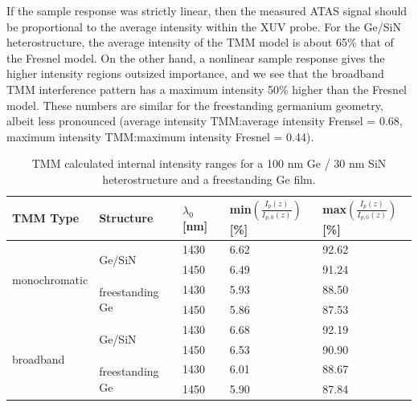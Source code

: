 If the sample response was strictly linear, then the measured ATAS signal should be proportional to the average intensity within the XUV probe. For the Ge/SiN heterostructure, the average intensity of the TMM model is about 65\% that of the Fresnel model. On the other hand, a nonlinear sample response gives the higher intensity regions outsized importance, and we see that the broadband TMM interference pattern has a maximum intensity 50\% higher than the Fresnel model. These numbers are similar for the freestanding germanium geometry, albeit less pronounced (average intensity TMM:average intensity Frensel = 0.68, maximum intensity TMM:maximum intensity Fresnel = 0.44).

\begin{table}[]
	\centering
	\begin{tabular}{l|l|l|l|l}
		\textbf{TMM Type} &
		\textbf{Structure} &
		\textbf{$\lambda_0$ {[}nm{]}} &
		\textbf{min$\left(\frac{I_p(z)}{I_{p,0}(z)}\right)$ {[}\%{]}} &
		\textbf{max$\left(\frac{I_p(z)}{I_{p,0}(z)}\right)$ {[}\%{]}} \\ \hline
		\multirow{4}{*}{monochromatic} & \multirow{2}{*}{Ge/SiN}          & 1430 & 6.62 & 92.62 \\
		&                                  & 1450 & 6.49 & 91.24\\ \cline{2-5} 
		& \multirow{2}{*}{freestanding Ge} & 1430 & 5.93 & 88.50 \\
		&                                  & 1450 & 5.86 & 87.53 \\ \hline
		\multirow{4}{*}{broadband}     & \multirow{2}{*}{Ge/SiN}          & 1430 & 6.68 & 92.19 \\
		&                                  & 1450 & 6.53 & 90.90 \\ \cline{2-5} 
		& \multirow{2}{*}{freestanding Ge} & 1430 & 6.01 & 88.67 \\
		&                                  & 1450 & 5.90 & 87.84
	\end{tabular}
	\caption{TMM calculated internal intensity ranges for a 100 nm Ge / 30 nm SiN heterostructure and a freestanding Ge film.}
	\label{tab:TMM_intensity_range}
\end{table}
